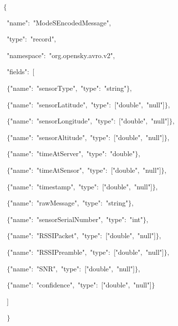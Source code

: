 {
\tt
{$\{$\leavevmode\par
{\ }"name":\ "ModeSEncodedMessage",\leavevmode\par
{\ }"type":\ "record",\leavevmode\par
{\ }"namespace":\ "org.opensky.avro.v2",\leavevmode\par
{\ }"fields":\ [\leavevmode\par
{\ }$\{$"name":\ "sensorType",\ "type":\ "string"$\}$,\leavevmode\par
{\ }$\{$"name":\ "sensorLatitude",\ "type":\ ["double",\ "null"]$\}$,\leavevmode\par
{\ }$\{$"name":\ "sensorLongitude",\ "type":\ ["double",\ "null"]$\}$,\leavevmode\par
{\ }$\{$"name":\ "sensorAltitude",\ "type":\ ["double",\ "null"]$\}$,\leavevmode\par
{\ }$\{$"name":\ "timeAtServer",\ "type":\ "double"$\}$,\leavevmode\par
{\ }$\{$"name":\ "timeAtSensor",\ "type":\ ["double",\ "null"]$\}$,\leavevmode\par
{\ }$\{$"name":\ "timestamp",\ "type":\ ["double",\ "null"]$\}$,\leavevmode\par
{\ }$\{$"name":\ "rawMessage",\ "type":\ "string"$\}$,\leavevmode\par
{\ }$\{$"name":\ "sensorSerialNumber",\ "type":\ "int"$\}$,\leavevmode\par
{\ }$\{$"name":\ "RSSIPacket",\ "type":\ ["double",\ "null"]$\}$,\leavevmode\par
{\ }$\{$"name":\ "RSSIPreamble",\ "type":\ ["double",\ "null"]$\}$,\leavevmode\par
{\ }$\{$"name":\ "SNR",\ "type":\ ["double",\ "null"]$\}$,\leavevmode\par
{\ }$\{$"name":\ "confidence",\ "type":\ ["double",\ "null"]$\}$\leavevmode\par
{\ }]\leavevmode\par
{\ }$\}$}\leavevmode\par
}

